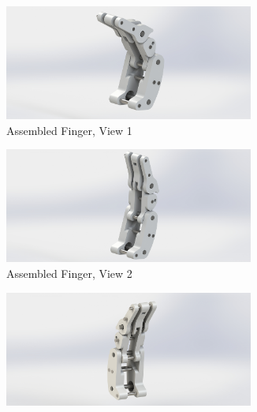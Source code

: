 \begin{figure}
    \centering
    \begin{subfigure}{.45\linewidth}
        \centering
        \includegraphics[width=0.9\textwidth]{Images/GripperDesign/8.JPG}
        \caption{Assembled Finger, View 1}
        \label{fig:AssFinger1}
    \end{subfigure}
    \begin{subfigure}{.45\linewidth}
        \centering
        \includegraphics[width=0.9\textwidth]{Images/GripperDesign/9.JPG}
        \caption{Assembled Finger, View 2}
        \label{fig:AssFinger2}
    \end{subfigure}
    \begin{subfigure}{.45\linewidth}
        \centering
        \includegraphics[width=0.9\textwidth]{Images/GripperDesign/10.JPG}

\end{subfigure}
\end{figure}
